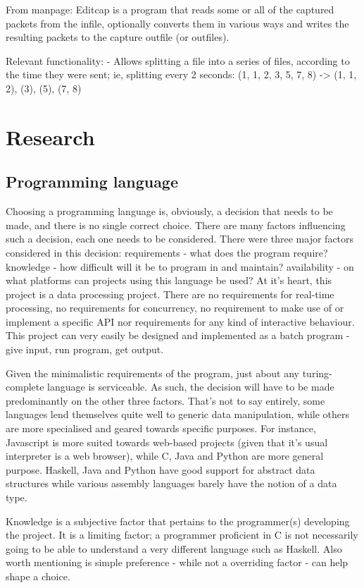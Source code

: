 \documentclass[10pt,a4paper]{report}
\begin{document}
From manpage\cite{editcap-man}:
\indent Editcap is a program that reads some or all of the captured packets from the infile, optionally converts them in various ways and writes the resulting packets to the capture outfile (or outfiles).

Relevant functionality:
 - Allows splitting a file into a series of files,
   according to the time they were sent; ie, splitting every 2 seconds:
   (1, 1, 2, 3, 5, 7, 8) -> (1, 1, 2), (3), (5), (7, 8)

\chapter{Research}
\section{Programming language}
Choosing a programming language is, obviously, a decision that needs to be made, and there is no single correct choice. There are many factors influencing such a decision, each one needs to be considered. There were three major factors considered in this decision: requirements - what does the program require? knowledge - how difficult will it be to program in and maintain? availability - on what platforms can projects using this language be used?
At it's heart, this project is a data processing project. There are no requirements for real-time processing, no requirements for concurrency, no requirement to make use of or implement a specific API nor requirements for any kind of interactive behaviour. This project can very easily be designed and implemented as a batch program - give input, run program, get output.

Given the minimalistic requirements of the program, just about any turing-complete language is serviceable. As such, the decision will have to be made predominantly on the other three factors. That's not to say entirely, some languages lend themselves quite well to generic data manipulation, while others are more specialised and geared towards specific purposes. For instance, Javascript is more suited towards web-based projects (given that it's usual interpreter is a web browser), while C, Java and Python are more general purpose. Haskell, Java and Python have good support for abstract data structures while various assembly languages barely have the notion of a data type.

Knowledge is a subjective factor that pertains to the programmer(s) developing the project. It is a limiting factor; a programmer proficient in C is not necessarily going to be able to understand a very different language such as Haskell. Also worth mentioning is simple preference - while not a overriding factor - can help shape a choice.
\end{document}
